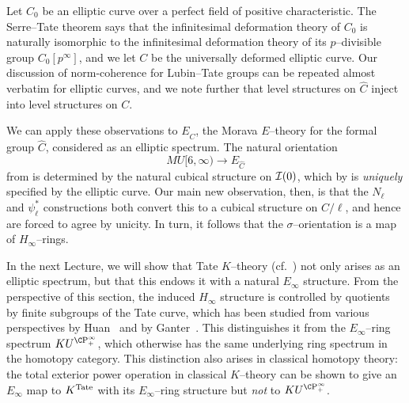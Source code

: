 \begin{example}
Let $C_0$ be an elliptic curve over a perfect field of positive characteristic.  The Serre--Tate theorem says that the infinitesimal deformation theory of $C_0$ is naturally isomorphic to the infinitesimal deformation theory of its $p$--divisible group $C_0[p^\infty]$, and we let $C$ be the universally deformed elliptic curve.  Our discussion of norm-coherence for Lubin--Tate groups can be repeated almost verbatim for elliptic curves, and we note further that level structures on $\widehat C$ inject into level structures on $C$.

We can apply these observations to $E_{\widehat C}$, the Morava $E$--theory for the formal group $\widehat C$, considered as an elliptic spectrum.  The natural orientation \[MU[6, \infty) \to E_{\widehat C}\] from  is determined by the natural cubical structure on $\mathcal{I}(0)$, which by  is \emph{uniquely} specified by the elliptic curve.  Our main new observation, then, is that the $N_\ell$ and $\psi_\ell^*$ constructions both convert this to a cubical structure on $C / \ell$, and hence are forced to agree by unicity.  In turn, it follows that the $\sigma$--orientation is a map of $H_\infty$--rings.
\end{example}

\begin{remark}
In the next Lecture, we will show that Tate $K$--theory (cf.\ ) not only arises as an elliptic spectrum, but that this endows it with a natural $E_\infty$ structure.  From the perspective of this section, the induced $H_\infty$ structure is controlled by quotients by finite subgroups of the Tate curve, which has been studied from various perspectives by Huan~\cite{Huan} and by Ganter~\cite{GanterStringyOpns,GanterPowerOpnsInTateKthy}.  This distinguishes it from the $E_\infty$--ring spectrum $KU^{\CP^\infty_+}$, which otherwise has the same underlying ring spectrum in the homotopy category.  This distinction also arises in classical homotopy theory: the total exterior power operation in classical $K$--theory can be shown to give an $E_\infty$ map to $K^{\mathrm{Tate}}$ with its $E_\infty$--ring structure but \emph{not} to $KU^{\CP^\infty_+}$.
\end{remark}

















